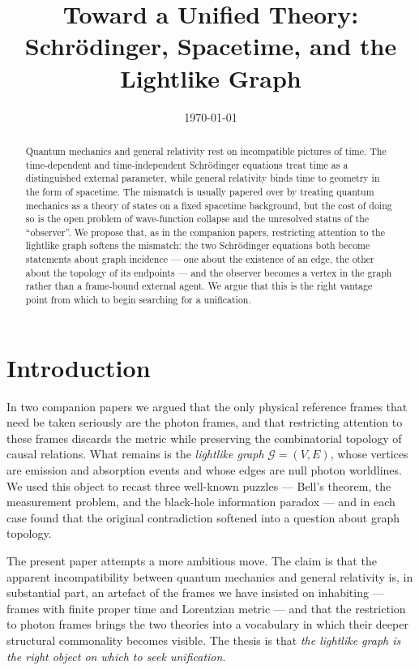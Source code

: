 \documentclass[11pt]{article}
\title{Toward a Unified Theory:\\
Schr\"odinger, Spacetime, and the Lightlike Graph}
\date{\today}
\begin{document}
\maketitle

\begin{abstract}
Quantum mechanics and general relativity rest on incompatible pictures of time. The time-dependent and time-independent Schr\"odinger equations treat time as a distinguished external parameter, while general relativity binds time to geometry in the form of spacetime. The mismatch is usually papered over by treating quantum mechanics as a theory of states on a fixed spacetime background, but the cost of doing so is the open problem of wave-function collapse and the unresolved status of the ``observer''. We propose that, as in the companion papers, restricting attention to the lightlike graph softens the mismatch: the two Schr\"odinger equations both become statements about graph incidence --- one about the existence of an edge, the other about the topology of its endpoints --- and the observer becomes a vertex in the graph rather than a frame-bound external agent. We argue that this is the right vantage point from which to begin searching for a unification.
\end{abstract}

\section{Introduction}

In two companion papers we argued that the only physical reference frames that need be taken seriously are the photon frames, and that restricting attention to these frames discards the metric while preserving the combinatorial topology of causal relations. What remains is the \emph{lightlike graph} $\mathcal{G} = (V, E)$, whose vertices are emission and absorption events and whose edges are null photon worldlines. We used this object to recast three well-known puzzles --- Bell's theorem, the measurement problem, and the black-hole information paradox --- and in each case found that the original contradiction softened into a question about graph topology.

The present paper attempts a more ambitious move. The claim is that the apparent incompatibility between quantum mechanics and general relativity is, in substantial part, an artefact of the frames we have insisted on inhabiting --- frames with finite proper time and Lorentzian metric --- and that the restriction to photon frames brings the two theories into a vocabulary in which their deeper structural commonality becomes visible. The thesis is that \emph{the lightlike graph is the right object on which to seek unification}.
\end{document}
